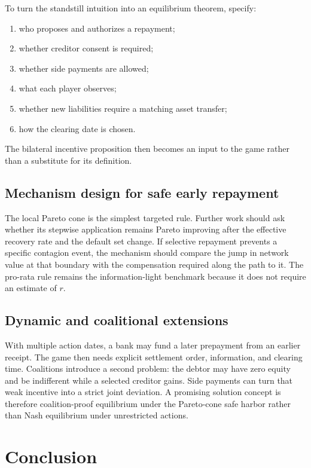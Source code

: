 \documentclass[11pt]{article}
\theoremstyle{definition}
\theoremstyle{remark}
\begin{document}
To turn the standstill intuition into an equilibrium theorem, specify:
\begin{enumerate}[label=(\roman*)]
  \item who proposes and authorizes a repayment;
  \item whether creditor consent is required;
  \item whether side payments are allowed;
  \item what each player observes;
  \item whether new liabilities require a matching asset transfer;
  \item how the clearing date is chosen.
\end{enumerate}
The bilateral incentive proposition then becomes an input to the game rather
than a substitute for its definition.

\subsection{Mechanism design for safe early repayment}

The local Pareto cone is the simplest targeted rule.  Further work should ask
whether its stepwise application remains Pareto improving after the effective
recovery rate and the default set change.  If selective repayment prevents a
specific contagion event, the mechanism should compare the jump in network
value at that boundary with the compensation required along the path to it.
The pro-rata rule remains the information-light benchmark because it does not
require an estimate of $r$.

\subsection{Dynamic and coalitional extensions}

With multiple action dates, a bank may fund a later prepayment from an earlier
receipt.  The game then needs explicit settlement order, information, and
clearing time.  Coalitions introduce a second problem: the debtor may have zero
equity and be indifferent while a selected creditor gains.  Side payments can
turn that weak incentive into a strict joint deviation.  A promising solution
concept is therefore coalition-proof equilibrium under the Pareto-cone safe
harbor rather than Nash equilibrium under unrestricted actions.

\section{Conclusion}
\end{document}
